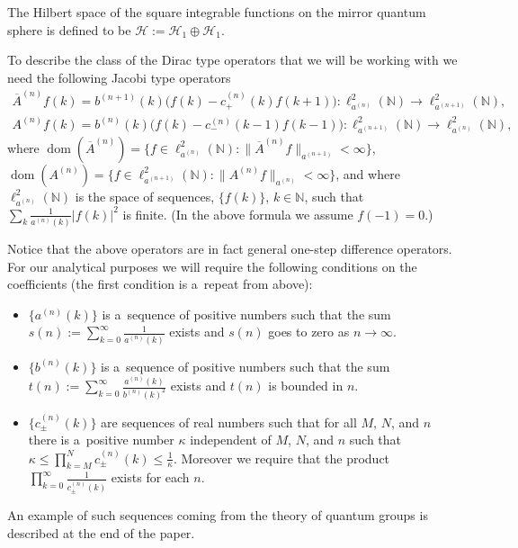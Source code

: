 \documentclass[pdftex]{sigma}
\numberwithin{equation}{section}
\DeclareMathOperator{\dom}{dom}
\begin{document}
The Hilbert space of the square integrable functions on the mirror quantum sphere is def\/ined to be $\mathcal{H}:=
\mathcal{H}_1\oplus \mathcal{H}_1$.

To describe the class of the Dirac type operators that we will be working with we need the following Jacobi type
operators
\begin{gather*}
\overline{A}^{(n)}f(k) = b^{(n+1)}(k)\Big(f(k) - c_+^{(n)}(k)f(k+1)\Big): \ell_{a^{(n)}}^2({\mathbb N})\to
\ell_{a^{(n+1)}}^2({\mathbb N}),
\\
A^{(n)}f(k) = b^{(n)}(k)\Big(f(k) - c_-^{(n)}(k-1)f(k-1)\Big): \ell_{a^{(n+1)}}^2({\mathbb N})\to
\ell_{a^{(n)}}^2({\mathbb N}),
\end{gather*}
where $\dom(\overline{A}^{(n)}) = \{f\in \ell_{a^{(n)}}^2({\mathbb N}):
\|\overline{A}^{(n)}f\|_{a^{(n+1)}}<\infty\}$, $\dom(A^{(n)}) = \{f\in \ell_{a^{(n+1)}}^2({\mathbb N}):
\|A^{(n)}f\|_{a^{(n)}}<\infty\}$, and where $\ell_{a^{(n)}}^2({\mathbb N})$ is the space of sequences, $\{f(k)\}$,
$k\in{\mathbb N}$, such that $\sum\limits_k \frac{1}{a^{(n)}(k)}|f(k)|^2$ is f\/inite.
(In the above formula we assume $f(-1)=0$.)

Notice that the above operators are in fact general one-step dif\/ference operators.
For our analytical purposes we will require the following conditions on the coef\/f\/icients
(the f\/irst condition is a~repeat from above):
\begin{itemize}\itemsep=0pt
\item
$\{a^{(n)}(k)\}$ is a~sequence of positive numbers such that the sum $s(n):=\sum\limits_{k=0}^\infty
\frac{1}{a^{(n)}(k)}$ exists and $s(n)$ goes to zero as $n\to\infty$.

\item
$\{b^{(n)}(k)\}$ is a~sequence of positive numbers such that the sum $t(n):= \sum\limits_{k=0}^\infty
\frac{a^{(n)}(k)}{b^{(n)}(k)^2}$ exists and $t(n)$ is bounded in $n$.

\item
$\{c_{\pm}^{(n)}(k)\}$ are sequences of real numbers such that for all $M$, $N$, and $n$ there is a~positive number
$\kappa$ independent of $M$, $N$, and $n$ such that $\kappa \le \prod\limits_{k=M}^N c_{\pm}^{(n)}(k) \le
\frac{1}{\kappa}$.
Moreover we require that the product $\prod\limits_{k=0}^\infty \frac{1}{c_{\pm}^{(n)}(k)}$ exists for each $n$.
\end{itemize}

An example of such sequences coming from the theory of quantum groups is described at the end of the paper.
\end{document}
